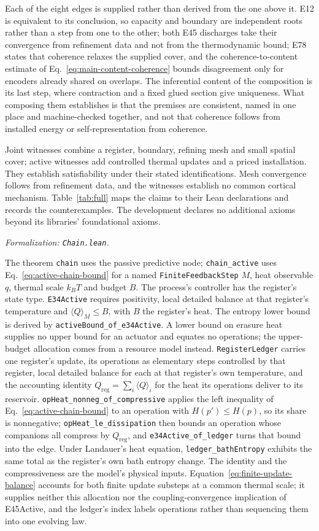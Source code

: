 \documentclass{article}
\begin{document}
Each of the eight edges is supplied rather than derived from the one above it. E12 is equivalent to its conclusion, so capacity and boundary are independent roots rather than a step from one to the other; both E45 discharges take their convergence from refinement data and not from the thermodynamic bound; E78 states that coherence relaxes the supplied cover, and the coherence-to-content estimate of Eq.~\eqref{eq:main-content-coherence} bounds disagreement only for encoders already shared on overlaps. The inferential content of the composition is its last step, where contraction and a fixed glued section give uniqueness. What composing them establishes is that the premises are consistent, named in one place and machine-checked together, and not that coherence follows from installed energy or self-representation from coherence.

Joint witnesses combine a register, boundary, refining mesh and small spatial cover; active witnesses add controlled thermal updates and a priced installation. They establish satisfiability under their stated identifications. Mesh convergence follows from refinement data, and the witnesses establish no common cortical mechanism. Table~\ref{tab:full} maps the claims to their Lean declarations and records the counterexamples. The development declares no additional axioms beyond its libraries' foundational axioms.

\textit{Formalization: \texttt{Chain.lean}.}

The theorem \texttt{chain} uses the passive predictive node; \texttt{chain\_active} uses Eq.~\eqref{eq:active-chain-bound} for a named \texttt{FiniteFeedbackStep} $M$, heat observable $q$, thermal scale $k_BT$ and budget $B$. The process's controller has the register's state type. \texttt{E34Active} requires positivity, local detailed balance at that register's temperature and $\langle Q\rangle_M\leq B$, with $B$ the register's heat. The entropy lower bound is derived by \nolinkurl{activeBound_of_e34Active}. A lower bound on erasure heat supplies no upper bound for an actuator and equates no operations; the upper-budget allocation comes from a resource model instead. \texttt{RegisterLedger} carries one register's update, its operations as elementary steps controlled by that register, local detailed balance for each at that register's own temperature, and the accounting identity $Q_{\mathrm{reg}}=\sum_i\langle Q\rangle_i$ for the heat its operations deliver to its reservoir. \nolinkurl{opHeat_nonneg_of_compressive} applies the left inequality of Eq.~\eqref{eq:active-chain-bound} to an operation with $H(p')\leq H(p)$, so its share is nonnegative; \nolinkurl{opHeat_le_dissipation} then bounds an operation whose companions all compress by $Q_{\mathrm{reg}}$, and \nolinkurl{e34Active_of_ledger} turns that bound into the edge. Under Landauer's heat equation, \nolinkurl{ledger_bathEntropy} exhibits the same total as the register's own bath entropy change. The identity and the compressiveness are the model's physical inputs. Equation~\eqref{eq:finite-update-balance} accounts for both finite update substeps at a common thermal scale; it supplies neither this allocation nor the coupling-convergence implication of E45Active, and the ledger's index labels operations rather than sequencing them into one evolving law.
\end{document}
